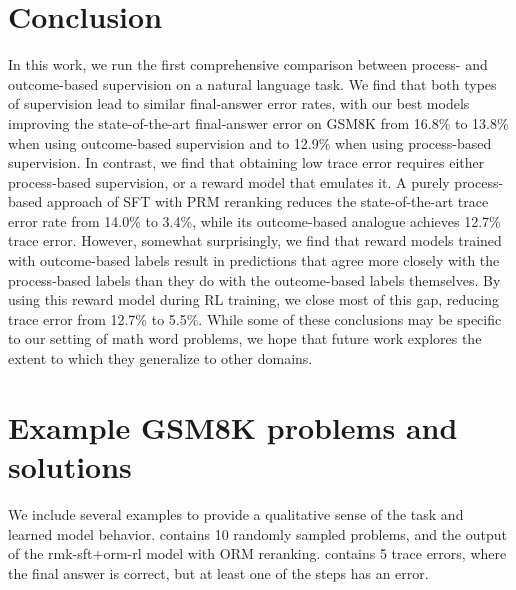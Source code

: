 \documentclass[11pt, a4paper, logo]{deepmind}
\newcommand{\PRM}{PRM}
\newcommand{\Short}[1]{\csname rmk-#1\endcsname}
\newcommand{\sftANDormrl}{\Short{sft+orm-rl}}
\begin{document}
{\section{Conclusion}
\label{sec:conclusion}
In this work, we run the first comprehensive comparison between process- and outcome-based supervision on a natural language task.  
We find that both types of supervision lead to similar final-answer error rates, with our best models improving the state-of-the-art final-answer error on GSM8K from 16.8\% to 13.8\% when using outcome-based supervision and to 12.9\% when using process-based supervision.
In contrast, we find that obtaining low trace error requires either process-based supervision, or a reward model that emulates it.
A purely process-based approach of SFT with \PRM{} reranking reduces the state-of-the-art trace error rate from 14.0\% to 3.4\%, while its outcome-based analogue achieves 12.7\% trace error.
However, somewhat surprisingly, we find that reward models trained with outcome-based labels result in predictions that agree more closely with the process-based labels than they do with the outcome-based labels themselves.
By using this reward model during RL training, we close most of this gap, reducing trace error from 12.7\% to 5.5\%.
While some of these conclusions may be specific to our setting of math word problems, we hope that future work explores the extent to which they generalize to other domains.



















\clearpage




\appendix
\clearpage{}\section{Example GSM8K problems and solutions}
\label{app:example_problems}

We include several examples to provide a qualitative sense of the task and learned model behavior.
 contains 10 randomly sampled problems, and the output of the \sftANDormrl{} model with ORM reranking.
 contains 5 trace errors, where the final answer is correct, but at least one of the steps has an error.

}
\end{document}
